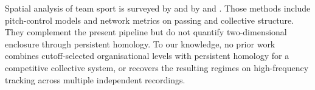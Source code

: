 Spatial analysis of team sport is surveyed by
\citet{gudmundsson2017} and by \citet{buldu2018} and \citet{grund2012}.
Those methods include pitch-control models and network metrics on
passing and collective structure. They complement the present pipeline
but do not quantify two-dimensional enclosure through persistent
homology. To our knowledge, no prior work combines cutoff-selected
organisational levels with persistent homology for a competitive
collective system, or recovers the resulting regimes on high-frequency
tracking across multiple independent recordings.
